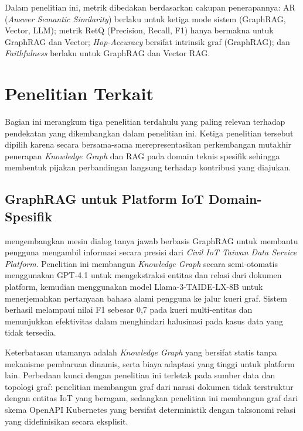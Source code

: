 Dalam penelitian ini, metrik dibedakan berdasarkan cakupan penerapannya: AR (\textit{Answer Semantic Similarity}) berlaku untuk ketiga mode sistem (GraphRAG, Vector, LLM); metrik RetQ (Precision, Recall, F1) hanya bermakna untuk GraphRAG dan Vector; \textit{Hop-Accuracy} bersifat intrinsik graf (GraphRAG); dan \textit{Faithfulness} berlaku untuk GraphRAG dan Vector RAG.

\section{Penelitian Terkait}
\label{sec:penelitian-terkait}

Bagian ini merangkum tiga penelitian terdahulu yang paling relevan terhadap pendekatan yang dikembangkan dalam penelitian ini. Ketiga penelitian tersebut dipilih karena secara bersama-sama merepresentasikan perkembangan mutakhir penerapan \textit{Knowledge Graph} dan RAG pada domain teknis spesifik sehingga membentuk pijakan perbandingan langsung terhadap kontribusi yang diajukan.

\subsection{GraphRAG untuk Platform IoT Domain-Spesifik}

\textcite{civiot2025graphrag} mengembangkan mesin dialog tanya jawab berbasis GraphRAG untuk membantu pengguna mengambil informasi secara presisi dari \textit{Civil IoT Taiwan Data Service Platform}. Penelitian ini membangun \textit{Knowledge Graph} secara semi-otomatis menggunakan GPT-4.1 untuk mengekstraksi entitas dan relasi dari dokumen platform, kemudian menggunakan model Llama-3-TAIDE-LX-8B untuk menerjemahkan pertanyaan bahasa alami pengguna ke jalur kueri graf. Sistem berhasil melampaui nilai F1 sebesar 0,7 pada kueri multi-entitas dan menunjukkan efektivitas dalam menghindari halusinasi pada kasus data yang tidak tersedia.

Keterbatasan utamanya adalah \textit{Knowledge Graph} yang bersifat statis tanpa mekanisme pembaruan dinamis, serta biaya adaptasi yang tinggi untuk platform lain. Perbedaan kunci dengan penelitian ini terletak pada sumber data dan topologi graf: penelitian \textcite{civiot2025graphrag} membangun graf dari narasi dokumen tidak terstruktur dengan entitas IoT yang beragam, sedangkan penelitian ini membangun graf dari skema OpenAPI Kubernetes yang bersifat deterministik dengan taksonomi relasi yang didefinisikan secara eksplisit.

